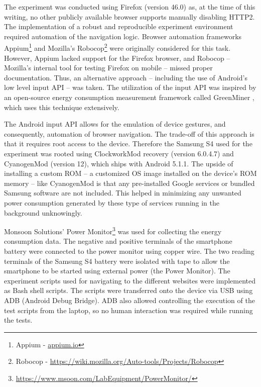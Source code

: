 \documentclass{article}
\begin{document}
The experiment was conducted using Firefox (version 46.0) as, at the time of this writing, no other publicly available browser supports manually disabling HTTP2. The implementation of a robust and reproducible experiment environment required automation of the navigation logic. Browser automation frameworks Appium\footnote{Appium - \url{appium.io}} and Mozilla’s Robocop\footnote{Robocop - \url{https://wiki.mozilla.org/Auto-tools/Projects/Robocop}} were originally considered for this task. However, Appium lacked support for the Firefox browser, and Robocop -- Mozilla’s internal tool for testing Firefox on mobile -- missed proper documentation. Thus, an alternative approach -- including the use of Android’s low level input API -- was taken. The utilization of the input API was inspired by an open-source energy consumption measurement framework called GreenMiner \citep{greenminer}, which uses this technique extensively.

The Android input API allows for the emulation of device gestures, and consequently, automation of browser navigation. The trade-off of this approach is that it requires root access to the device. Therefore the Samsung S4 used for the experiment was rooted using ClockworkMod recovery (version 6.0.4.7) and CyanogenMod (version 12), which ships with Android 5.1.1. The upside of installing a custom ROM -- a customized OS image installed on the device's ROM memory -- like CyanogenMod is that any pre-installed Google services or bundled Samsung software are not included. This helped in minimizing any unwanted power consumption generated by these type of services running in the background unknowingly.

Monsoon Solutions' Power Monitor\footnote{\url{https://www.msoon.com/LabEquipment/PowerMonitor/}} was used for collecting the energy consumption data. The negative and positive terminals of the smartphone battery were connected to the power monitor using copper wire. The two reading terminals of the Samsung S4 battery were isolated with tape to allow the smartphone to be started using external power (the Power Monitor). The experiment scripts used for navigating to the different websites were implemented as Bash shell scripts. The scripts were transferred onto the device via USB using ADB (Android Debug Bridge). ADB also allowed controlling the execution of the test scripts from the laptop, so no human interaction was required while running the tests.
\end{document}
